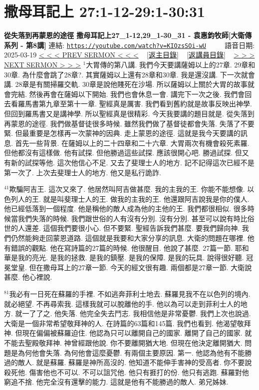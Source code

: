\documentclass{book}
\begin{document}
\section{撒母耳記上 27:1-12-29:1-30:31}
\label{sec:KIOzsSOi_wU}
\textbf{從失落到再蒙恩的途徑 撒母耳記上27\_1-12,29\_1-30\_31 - 袁惠鈞牧師[大衛傳系列 - 第8講]}
\newline
\newline
連結: \href{https://youtube.com/watch?v=KIOzsSOi-wU}{\texttt{https://youtube.com/watch?v=KIOzsSOi-wU}} ~~~~ 語音日期: 2025-03-19
\newline
\newline
\hyperref[sec:86NlAlqZbEc]{< < < PREV SERMON < < <}
~
\hyperlink{toc}{[返主目錄]}
~
\hyperref[ch:preacher11]{[返講員目錄]}
~
\hyperref[sec:9ORA5941xxk]{> > > NEXT SERMON > > >}
\newline
\newline
$^{1}$大胃傳的第八講.
我們今天要講薩姆以上的27章.
29章和30章.
為什麼會跳了28章?.
其實薩姆以上還有28章和30章.
我是還沒講.
下一次就會講.
28章是有關掃羅交軌.
30章是說他賤死在沙場.
所以薩姆以上關於大胃的故事就會完結.
然後再會在薩姆以下開始.
我們也會休息一會.
講完下一次之後.
我們會回去看羅馬書第九章至第十一章.
聖經真是厲害.
我們看到舊約就是故事反映出神學.
但回到羅馬書又是講神學.
所以聖經真是很精彩.
今天我要講的題目就是.
從失落到再蒙恩的途徑.
我們做基督徒很多時候.
雖然我們做了基督徒都會失落.
失落了不要緊.
但最重要是怎樣再一次蒙神的因典.
走上蒙恩的途徑.
這就是我今天要講的訊息.
首先一些背景.
在薩姆以上的二十四章和二十六章.
大胃兩次有機會殺死素羅.
但他都沒有這樣做.
他有試探.
但他勝過這些試探.
應該很開心吧.
勝過試探.
但又有新的試探等他.
這次他信心不足.
又去了斐理士人的地方.
記不記得這次已經不是第一次了.
上次去斐理士人的地方.
他又是私行詭詐.

$^{41}$欺騙阿吉王.
這次又來了.
他居然叫阿吉做甚麼.
我的主我的王.
你能不能想像.
以色列人的王.
就是叫斐理士人的王.
做我的主我的王.
他還跟阿吉說我是你的僕人.
他已經低落到一個程度.
他是稱他的敵人成為他的主他的王.
我們都很相似.
很多時候當我們失落的時候.
我們跟世俗的人有沒有分別.
沒有分別.
甚至可以說有時比俗世的人還差.
這個我們要很小心.
但不要緊.
聖經告訴我們甚麼.
要我們歸向神.
我們仍然能夠走回蒙恩道路.
這個就是我要和大家分享的訊息.
大衛的問題在哪裡.
他有錯誤的觀點.
他在寫詩篇的27篇的時候.
他很醒目.
他說了甚麼.
27篇一節.
耶和華是我的亮光.
是我的拯救.
是我的鎮壓.
是我的保障.
是我的玩具.
說得很好聽.
冠冕堂皇.
但在撒母耳上的27章一節.
今天的經文很有趣.
兩個都是27章一節.
大衛說甚麼.
他心裡說.

$^{81}$我必有一日死在蘇羅的手裡.
不如逃奔菲利士地去.
蘇羅見我不在以色列的境內.
就必絕望.
不再尋索我.
這樣我就可以脫離他的手.
他以為可以走到菲利士人的地方.
就一了了之.
他失落.
他完全失去鬥志.
我相信他是非常憂鬱.
我們上次也說過.
大衛是一個非常希望敬拜神的人.
在詩篇的63篇和145篇.
我們也看到.
他渴望敬拜神.
但現在偏偏被蘇羅迫住.
他認為只可以離開自己的國家.
離開了自己的國家.
就不能去聖殿敬拜神.
神曾經跟他說.
你不要離開猶大地.
但現在他決定離開猶大.
問題是為何他會失落.
為何他會這麼憂鬱.
有兩個主要原因.
第一.
他認為他有不能勝過的敵人.
就是蘇羅.
蘇羅是神所高沒的.
他知道不能伸手害神的受高者.
你不要說殺死他.
傷害他也不可以.
不可以詛咒他.
他只有捱打的份.
他只有逃跑.
蘇羅對他窮追不捨.
他完全沒有還擊的能力.
這就是他有不能勝過的敵人.
弟兄姊妹.
\end{document}
